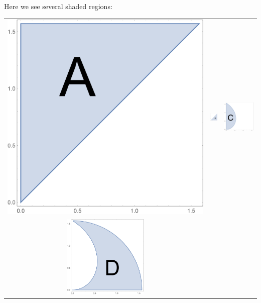 \documentclass{ximera}
\begin{document}
\begin{exercise}
  Here we see several shaded regions:
  \begin{center}
    \begin{tabular}{ccc}
      \includegraphics[scale=.5]{region2.png} &
      \includegraphics[width=1cm]{region1.png} &
      \includegraphics[width=4cm]{region6.png} 
      \\
      \includegraphics[width=4cm]{region5.png} &

\end{tabular}
\end{center}
\end{exercise}
\end{document}
